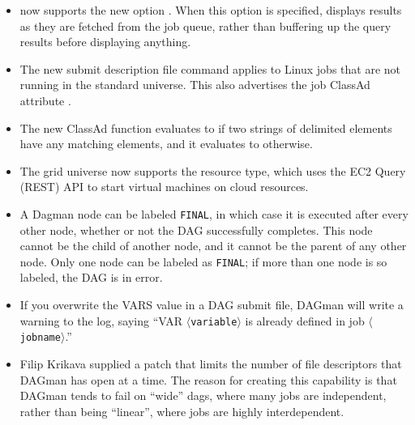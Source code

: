 \begin{itemize}

\item {} now supports the new option .
  When this option is specified,  displays results as they
  are fetched from the job queue, rather than buffering up the query
  results before displaying anything.

\item The new submit description file command  
  applies to Linux jobs that are not running in the standard universe. 
  This also advertises the job ClassAd attribute .

\item The new ClassAd function  evaluates to 
   if two strings of delimited elements have any matching elements,
  and it evaluates to  otherwise.

\item The grid universe now supports the  resource type,
  which uses the EC2 Query (REST) API to start virtual machines on cloud
  resources.

\item A Dagman node can be labeled \texttt{FINAL}, in which case it is executed
after every other node, whether or not the DAG successfully completes.  This
node cannot be the child of another node, and it cannot be the parent of any
other node. Only one node can be labeled as \texttt{FINAL}; if more than one
node is so labeled, the DAG is in error.

\item If you overwrite the VARS value in a DAG submit file, DAGman will write a
warning to the log, saying ``VAR $\langle$\texttt{variable}$\rangle$ is already
defined in job $\langle$\texttt{jobname}$\rangle$.''

\item Filip Krikava supplied a patch that limits the number of file descriptors
that DAGman has open at a time. The reason for creating this capability is that
DAGman tends to fail on ``wide'' dags, where many jobs are independent, rather
than being ``linear'', where jobs are highly interdependent.
\end{itemize}

